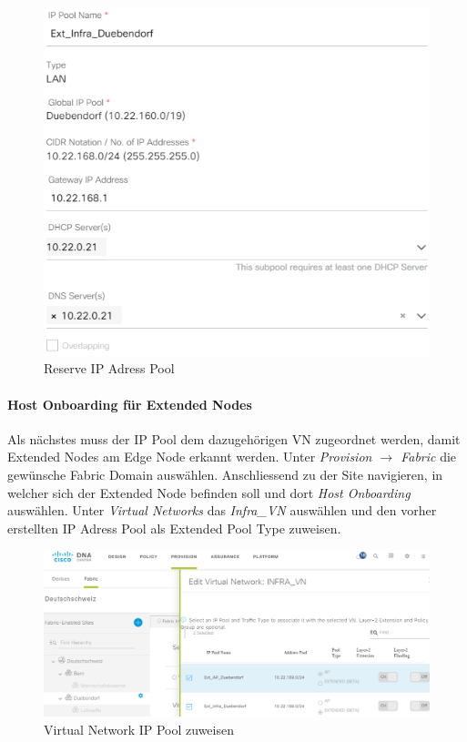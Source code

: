 \begin{figure}[H]
	\centering
	\includegraphics[width=0.6\linewidth]{img/Absicherung/ExtendedNode1}
	\caption{Reserve IP Adress Pool}
	\label{fig:Reserve IP Adress Pool}
\end{figure}

\paragraph{Host Onboarding für Extended Nodes} Als nächstes muss der IP Pool dem dazugehörigen VN zugeordnet werden, damit Extended Nodes am Edge Node erkannt werden. Unter \textit{Provision $\rightarrow$ Fabric} die gewünsche Fabric Domain auswählen. Anschliessend zu der Site navigieren, in welcher sich der Extended Node befinden soll und dort \textit{Host Onboarding} auswählen. Unter \textit{Virtual Networks} das \textit{Infra\_VN} auswählen und den vorher erstellten IP Adress Pool als Extended Pool Type zuweisen. 

\begin{figure}[H]
	\centering
	\includegraphics[width=1\linewidth]{img/Absicherung/ExtendedNode2}
	\caption{Virtual Network IP Pool zuweisen}
	\label{fig:Virtual Network IP Pool zuweisen}
\end{figure}


